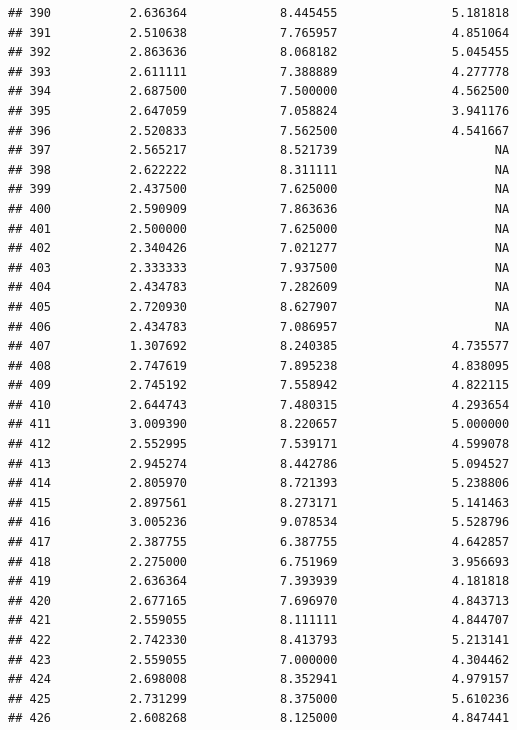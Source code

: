 \documentclass[]{article}
\begin{document}
\begin{verbatim}
## 390           2.636364             8.445455                5.181818
## 391           2.510638             7.765957                4.851064
## 392           2.863636             8.068182                5.045455
## 393           2.611111             7.388889                4.277778
## 394           2.687500             7.500000                4.562500
## 395           2.647059             7.058824                3.941176
## 396           2.520833             7.562500                4.541667
## 397           2.565217             8.521739                      NA
## 398           2.622222             8.311111                      NA
## 399           2.437500             7.625000                      NA
## 400           2.590909             7.863636                      NA
## 401           2.500000             7.625000                      NA
## 402           2.340426             7.021277                      NA
## 403           2.333333             7.937500                      NA
## 404           2.434783             7.282609                      NA
## 405           2.720930             8.627907                      NA
## 406           2.434783             7.086957                      NA
## 407           1.307692             8.240385                4.735577
## 408           2.747619             7.895238                4.838095
## 409           2.745192             7.558942                4.822115
## 410           2.644743             7.480315                4.293654
## 411           3.009390             8.220657                5.000000
## 412           2.552995             7.539171                4.599078
## 413           2.945274             8.442786                5.094527
## 414           2.805970             8.721393                5.238806
## 415           2.897561             8.273171                5.141463
## 416           3.005236             9.078534                5.528796
## 417           2.387755             6.387755                4.642857
## 418           2.275000             6.751969                3.956693
## 419           2.636364             7.393939                4.181818
## 420           2.677165             7.696970                4.843713
## 421           2.559055             8.111111                4.844707
## 422           2.742330             8.413793                5.213141
## 423           2.559055             7.000000                4.304462
## 424           2.698008             8.352941                4.979157
## 425           2.731299             8.375000                5.610236
## 426           2.608268             8.125000                4.847441

\end{verbatim}
\end{document}
